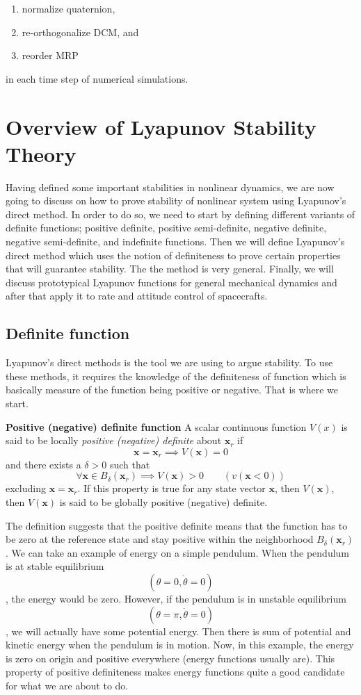 \documentclass{article}
\begin{document}
\begin{enumerate}[noitemsep]
  \item normalize quaternion,
  \item re-orthogonalize DCM, and
  \item reorder MRP
\end{enumerate}

in each time step of numerical simulations.

\section{Overview of Lyapunov Stability Theory}
Having defined some important stabilities in nonlinear dynamics, we are now going to discuss on how to prove stability of nonlinear system using Lyapunov's direct method. In order to do so, we need to start by defining different variants of definite functions; positive definite, positive semi-definite, negative definite, negative semi-definite, and indefinite functions. Then we will define Lyapunov's direct method which uses the notion of definiteness to prove certain properties that will guarantee stability. The the method is very general. Finally, we will discuss prototypical Lyapunov functions for general mechanical dynamics and after that apply it to rate and attitude control of spacecrafts. 

\subsection{Definite function}
Lyapunov's direct methods is the tool we are using to argue stability. To use these methods, it requires the knowledge of the definiteness of function which is basically measure of the function being positive or negative. That is where we start.

\textbf{Positive (negative) definite function} A scalar continuous function $V(x)$ is said to be locally \textit{positive (negative) definite} about $\bm{x}_{r}$ if
$$
\bm{x}=\bm{x}_{r}\implies V(\bm{x})=0
$$
and there exists a $\delta>0$ such that
$$
\forall\bm{x}\in B_{\delta}(\bm{x}_{r})\implies V(\bm{x})>0\quad\quad(v(\bm{x}<0))
$$
excluding $\bm{x}=\bm{x}_{r}$. If this property is true for any state vector $\bm{x}$, then $V(\bm{x})$, then $V(\bm{x})$ is said to be globally positive (negative) definite.

The definition suggests that the positive definite means that the function has to be zero at the reference state and stay positive within the neighborhood $B_{\delta}(\bm{x}_{r})$. We can take an example of energy on a simple pendulum. When the pendulum is at stable equilibrium $$(\theta=0,\dot{\theta}=0)$$, the energy would be zero. However, if the pendulum is in unstable equilibrium $$(\theta=\pi,\dot{\theta}=0)$$, we will actually have some potential energy. Then there is sum of potential and kinetic energy when the pendulum is in motion. Now, in this example, the energy is zero on origin and positive everywhere (energy functions usually are). This property of positive definiteness makes energy functions quite a good candidate for what we are about to do.
\end{document}
